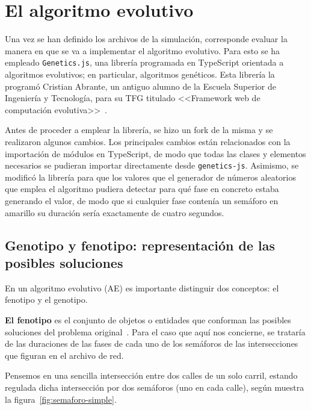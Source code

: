 \section{El algoritmo evolutivo}

Una vez se han definido los archivos de la simulación, corresponde evaluar la manera en que se va a implementar el algoritmo evolutivo. Para esto se ha empleado \texttt{Genetics.js}, una librería programada en TypeScript orientada a algoritmos evolutivos; en particular, algoritmos genéticos. Esta librería la programó Cristian Abrante, un antiguo alumno de la Escuela Superior de Ingeniería y Tecnología, para su TFG titulado <<Framework web de computación evolutiva>>~\cite{abrante_dorta_framework_2019}. 

Antes de proceder a emplear la librería, se hizo un fork de la misma y se realizaron algunos cambios. Los principales cambios están relacionados con la importación de módulos en TypeScript, de modo que todas las clases y elementos necesarios se pudieran importar directamente desde \texttt{genetics-js}. Asimismo, se modificó la librería para que los valores que el generador de números aleatorios que emplea el algoritmo pudiera detectar para qué fase en concreto estaba generando el valor, de modo que si cualquier fase contenía un semáforo en amarillo su duración sería exactamente de cuatro segundos.

\subsection{Genotipo y fenotipo: representación de las posibles soluciones}

En un algoritmo evolutivo (AE) es importante distinguir dos conceptos: el fenotipo y el genotipo.

\textbf{El fenotipo} es el conjunto de objetos o entidades que conforman las posibles soluciones del problema original~\cite{eiben_introduction_2003}. Para el caso que aquí nos concierne, se trataría de las duraciones de las fases de cada uno de los semáforos de las intersecciones que figuran en el archivo de red.

Pensemos en una sencilla intersección entre dos calles de un solo carril, estando regulada dicha intersección por dos semáforos (uno en cada calle), según muestra la figura~\ref{fig:semaforo-simple}.

